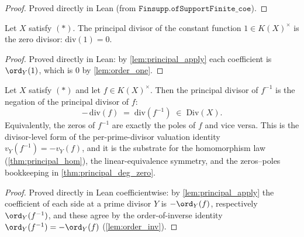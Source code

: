 \begin{proof}
  Proved directly in Lean (from \(\texttt{Finsupp.ofSupportFinite\_coe}\)).
\end{proof}
\begin{lemma}

  \label{lem:principal_one}
  Let \(X\) satisfy \((*)\). The principal divisor of the constant function
  \(1 \in K(X)^{\times}\) is the zero divisor: \(\mathrm{div}(1) = 0\).
\end{lemma}
\begin{proof}
  Proved directly in Lean: by \ref{lem:principal_apply} each coefficient is
  \(\ord_Y(1)\), which is \(0\) by \ref{lem:order_one}.
\end{proof}
\begin{lemma}

  \label{lem:principal_inv}
  Let \(X\) satisfy \((*)\) and let \(f \in K(X)^{\times}\). Then the principal
  divisor of \(f^{-1}\) is the negation of the principal divisor of \(f\):
  \[
    -\,\mathrm{div}(f) \;=\; \mathrm{div}(f^{-1}) \;\in\; \mathrm{Div}(X).
  \]
  Equivalently, the zeros of \(f^{-1}\) are exactly the poles of \(f\) and vice
  versa. This is the divisor-level form of the per-prime-divisor valuation
  identity \(v_Y(f^{-1}) = -v_Y(f)\), and it is the substrate for the
  homomorphism law (\ref{thm:principal_hom}), the linear-equivalence symmetry,
  and the zeros--poles bookkeeping in \ref{thm:principal_deg_zero}.
\end{lemma}
\begin{proof}
  Proved directly in Lean coefficientwise: by \ref{lem:principal_apply} the
  coefficient of each side at a prime divisor \(Y\) is \(-\ord_Y(f)\),
  respectively \(\ord_Y(f^{-1})\), and these agree by the order-of-inverse
  identity \(\ord_Y(f^{-1}) = -\ord_Y(f)\) (\ref{lem:order_inv}).
\end{proof}
